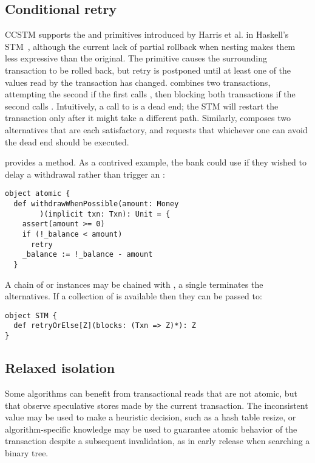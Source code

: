 \subsection{Conditional retry}

CCSTM supports the  and  primitives introduced by
Harris et al. in Haskell's STM~\cite{harris05ctm}, although the current
lack of partial rollback when nesting makes them less expressive than the original.
The  primitive causes the surrounding transaction to be rolled
back, but retry is postponed until at least one of the values read by
the transaction has changed.   combines two transactions,
attempting the second if the first calls , then blocking
both transactions if the second calls .  Intuitively, a call
to  is a dead end; the STM will restart the transaction
only after it might take a different path.  Similarly, 
composes two alternatives that are each satisfactory, and requests that
whichever one can avoid the dead end should be executed.

 provides a  method.  As a contrived example,
the bank could use  if they wished to delay a withdrawal
rather than trigger an :
\lstset{numbers=none}
\begin{lstlisting}
object atomic {
  def withdrawWhenPossible(amount: Money
        )(implicit txn: Txn): Unit = {
    assert(amount >= 0)
    if (!_balance < amount)
      retry
    _balance := !_balance - amount
  }
\end{lstlisting}
\lstset{numbers=left}

A chain of  or  instances may be chained
with , a single  terminates the alternatives.
If a collection of \code{~=>~} is available then
they can be passed to:
\lstset{numbers=none}
\begin{lstlisting}
object STM {
  def retryOrElse[Z](blocks: (Txn => Z)*): Z
}
\end{lstlisting}
\lstset{numbers=left}


\subsection{Relaxed isolation}
\label{sec:unrecordedread}

Some algorithms can benefit from transactional reads that are not
atomic, but that observe speculative stores made by the current
transaction.  The inconsistent value may be used to make a heuristic decision,
such as a hash table resize, or algorithm-specific knowledge
may be used to guarantee atomic behavior of the transaction despite
a subsequent invalidation, as in early release when searching a binary tree.

